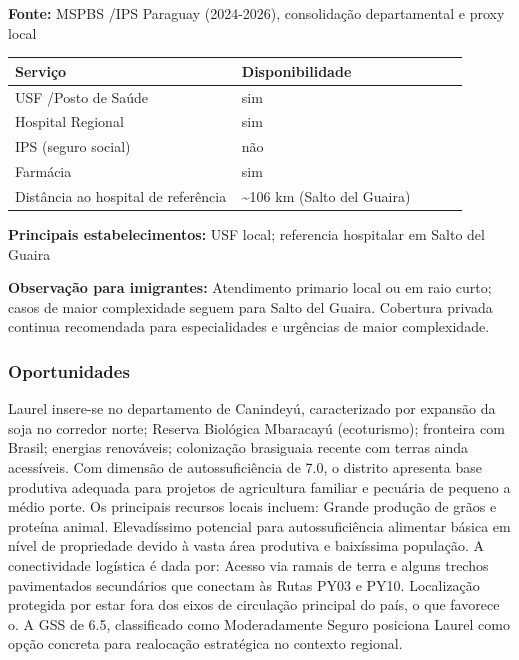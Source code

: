 \textbf{Fonte:} MSPBS /\allowbreak  IPS Paraguay (2024-2026), consolidação
departamental e proxy local

{\def\LTcaptype{none} %
\begin{longtable}{@{}>{\raggedright\arraybackslash}p{0.45\linewidth} >{\raggedright\arraybackslash}p{0.45\linewidth}@{}}
\toprule\noalign{}
Serviço & Disponibilidade \\
\midrule\noalign{}
\endhead
\bottomrule\noalign{}
\endlastfoot
USF /\allowbreak  Posto de Saúde & sim \\
Hospital Regional & sim \\
IPS (seguro social) & não \\
Farmácia & sim \\
Distância ao hospital de referência & \textasciitilde106 km (Salto del
Guaira) \\
\end{longtable}
}

\textbf{Principais estabelecimentos:} USF local; referencia hospitalar
em Salto del Guaira

\textbf{Observação para imigrantes:} Atendimento primario local ou em
raio curto; casos de maior complexidade seguem para Salto del Guaira.
Cobertura privada continua recomendada para especialidades e urgências
de maior complexidade.
\newpage

\subsubsection*{Oportunidades}\label{oport-laurel-1416}
Laurel insere-se no departamento de Canindeyú, caracterizado por expansão da soja no corredor norte; Reserva Biológica Mbaracayú (ecoturismo); fronteira com Brasil; energias renováveis; colonização brasiguaia recente com terras ainda acessíveis. Com dimensão de autossuficiência de 7.0, o distrito apresenta base produtiva adequada para projetos de agricultura familiar e pecuária de pequeno a médio porte. Os principais recursos locais incluem: Grande produção de grãos e proteína animal. Elevadíssimo potencial para autossuficiência alimentar básica em nível de propriedade devido à vasta área produtiva e baixíssima população. A conectividade logística é dada por: Acesso via ramais de terra e alguns trechos pavimentados secundários que conectam às Rutas PY03 e PY10. Localização protegida por estar fora dos eixos de circulação principal do país, o que favorece o. A GSS de 6.5, classificado como Moderadamente Seguro posiciona Laurel como opção concreta para realocação estratégica no contexto regional.

